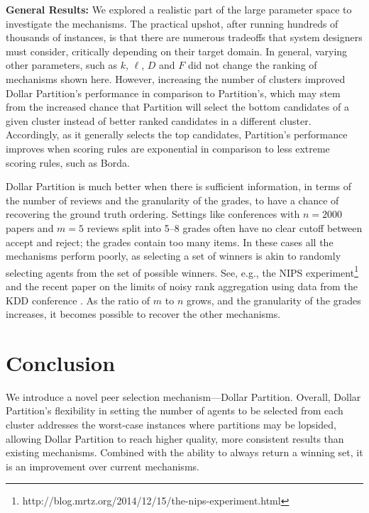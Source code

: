 \documentclass[letterpaper]{article}
\begin{document}
\smallskip  \noindent
\textbf{General Results:} We explored a realistic part of the large parameter space to investigate the mechanisms. The practical upshot, after running hundreds of thousands of instances, is that there are numerous tradeoffs that system designers must consider, critically depending on their target domain. In general, varying other parameters, such as $k$, $\ell$, $D$ and $F$ did not change the ranking of mechanisms shown here. However, increasing the number of clusters improved Dollar Partition's performance in comparison to Partition's, which may stem from the increased chance that Partition will select the bottom candidates of a given cluster instead of better ranked candidates in a different cluster. Accordingly, as it generally selects the top candidates, Partition's performance improves when scoring rules are exponential in comparison to less extreme scoring rules, such as Borda.

Dollar Partition is much better when there is sufficient information, in terms of the number of reviews and the granularity of the grades, to have a chance of recovering the ground truth ordering. Settings like conferences with $n=2000$ papers and $m=5$ reviews split into 5--8 grades often have no clear cutoff between accept and reject; the grades contain too many items. In these cases all the mechanisms perform poorly, as selecting a set of winners is akin to randomly selecting agents from the set of possible winners. See, e.g., the NIPS experiment\footnote{http://blog.mrtz.org/2014/12/15/the-nips-experiment.html} and the recent paper on the limits of noisy rank aggregation using data from the KDD conference \cite{JoRa15a}. As the ratio of $m$ to $n$ grows, and the granularity of the grades increases, it becomes possible to recover  the other mechanisms.







\section{Conclusion}

We introduce a novel peer selection mechanism---Dollar Partition.
Overall, Dollar Partition's flexibility in setting the number of agents to be selected from each cluster addresses the worst-case instances where partitions may be lopsided, allowing Dollar Partition to reach higher quality, more consistent results than existing mechanisms. Combined with the ability to always return a winning set, it is an improvement over current mechanisms.
\end{document}
